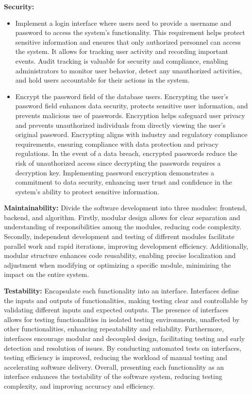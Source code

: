 \documentclass[journal]{IEEEtran}
\begin{document}
\textbf{Security:}
\begin{itemize}
  \item Implement a login interface where users need to provide a username and password to access the system's functionality. 
  This requirement helps protect sensitive information and ensures that only authorized personnel can access the system. It allows for tracking user activity and recording important events. Audit tracking is valuable for security and compliance, enabling administrators to monitor user behavior, detect any unauthorized activities, and hold users accountable for their actions in the system.

  \item Encrypt the password field of the database users. 
  Encrypting the user's password field enhances data security, protects sensitive user information, and prevents malicious use of passwords. Encryption helps safeguard user privacy and prevents unauthorized individuals from directly viewing the user's original password. Encrypting aligns with industry and regulatory compliance requirements, ensuring compliance with data protection and privacy regulations. In the event of a data breach, encrypted passwords reduce the risk of unauthorized access since decrypting the passwords requires a decryption key. Implementing password encryption demonstrates a commitment to data security, enhancing user trust and confidence in the system's ability to protect sensitive information.

\end{itemize}

\textbf{Maintainability:}
Divide the software development into three modules: frontend, backend, and algorithm. 
Firstly, modular design allows for clear separation and understanding of responsibilities among the modules, reducing code complexity. Secondly, independent development and testing of different modules facilitate parallel work and rapid iterations, improving development efficiency. Additionally, modular structure enhances code reusability, enabling precise localization and adjustment when modifying or optimizing a specific module, minimizing the impact on the entire system.

\textbf{Testability:}
Encapsulate each functionality into an interface. 
Interfaces define the inputs and outputs of functionalities, making testing clear and controllable by validating different inputs and expected outputs. The presence of interfaces allows for testing functionalities in isolated testing environments, unaffected by other functionalities, enhancing repeatability and reliability. Furthermore, interfaces encourage modular and decoupled design, facilitating testing and early detection and resolution of issues. By conducting automated tests on interfaces, testing efficiency is improved, reducing the workload of manual testing and accelerating software delivery. Overall, presenting each functionality as an interface enhances the testability of the software system, reducing testing complexity, and improving accuracy and efficiency.
\end{document}
